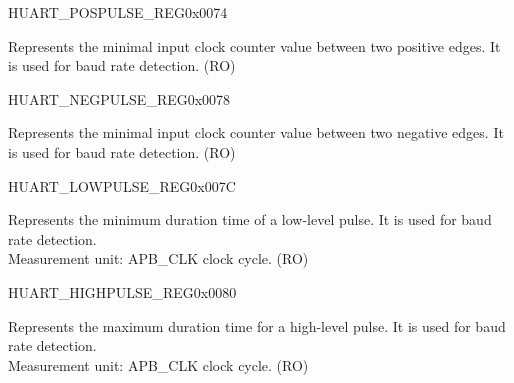 \begin{register}{H}{UART\_POSPULSE\_REG}{0x0074}\label{regdesc:UARTPOSPULSEREG}
%
%
\regnewline%
\begin{regdesc}\begin{reglist}
\label{fielddesc:UARTPOSEDGEMINCNT}\item [UART\_POSEDGE\_MIN\_CNT] Represents the minimal input clock counter value between two positive edges. It is used for baud rate detection. (RO)
\end{reglist}\end{regdesc}
\end{register}


\begin{register}{H}{UART\_NEGPULSE\_REG}{0x0078}\label{regdesc:UARTNEGPULSEREG}
%
%
\regnewline%
\begin{regdesc}\begin{reglist}
\label{fielddesc:UARTNEGEDGEMINCNT}\item [UART\_NEGEDGE\_MIN\_CNT] Represents the minimal input clock counter value between two negative edges. It is used for baud rate detection. (RO)
\end{reglist}\end{regdesc}
\end{register}


\begin{register}{H}{UART\_LOWPULSE\_REG}{0x007C}\label{regdesc:UARTLOWPULSEREG}
%
%
\regnewline%
\begin{regdesc}\begin{reglist}
\label{fielddesc:UARTLOWPULSEMINCNT}\item [UART\_LOWPULSE\_MIN\_CNT] Represents the minimum duration time of a low-level pulse. It is used for baud rate detection.\\Measurement unit: APB\_CLK clock cycle. (RO)
\end{reglist}\end{regdesc}
\end{register}


\begin{register}{H}{UART\_HIGHPULSE\_REG}{0x0080}\label{regdesc:UARTHIGHPULSEREG}
%
%
\regnewline%
\begin{regdesc}\begin{reglist}
\label{fielddesc:UARTHIGHPULSEMINCNT}\item [UART\_HIGHPULSE\_MIN\_CNT] Represents  the maximum duration time for a high-level pulse. It is used for baud rate detection.\\Measurement unit: APB\_CLK clock cycle.  (RO)
\end{reglist}\end{regdesc}
\end{register}



